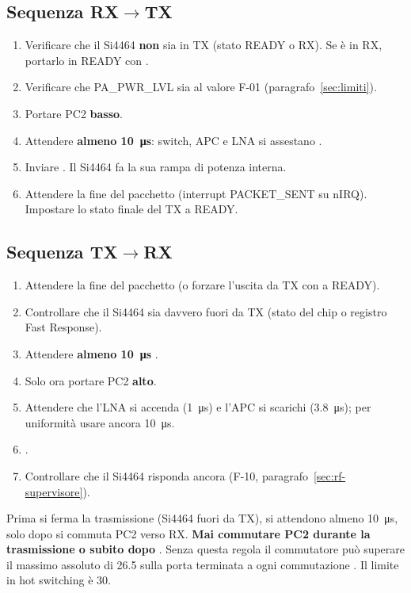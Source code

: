 \subsection{Sequenza RX\texorpdfstring{$\to$}{->}TX}
\begin{enumerate}
\item Verificare che il Si4464 \textbf{non} sia in TX (stato READY o RX). Se è in RX, portarlo in READY con .
\item Verificare che PA\_PWR\_LVL sia al valore F-01 (paragrafo~\ref{sec:limiti}).
\item Portare PC2 \textbf{basso}.
\item Attendere \textbf{almeno \SI{10}{\micro\second}}: switch, APC e LNA si assestano .
\item Inviare . Il Si4464 fa la sua rampa di potenza interna.
\item Attendere la fine del pacchetto (interrupt PACKET\_SENT su nIRQ). Impostare lo stato finale del TX a READY.
\end{enumerate}

\subsection{Sequenza TX\texorpdfstring{$\to$}{->}RX}
\begin{enumerate}
\item Attendere la fine del pacchetto (o forzare l'uscita da TX con  a READY).
\item Controllare che il Si4464 sia davvero fuori da TX (stato del chip o registro Fast Response).
\item Attendere \textbf{almeno \SI{10}{\micro\second}} .
\item Solo ora portare PC2 \textbf{alto}.
\item Attendere che l'LNA si accenda (\SI{1}{\micro\second}) e l'APC si scarichi (\SI{3.8}{\micro\second}); per uniformità usare ancora \SI{10}{\micro\second}.
\item {}.
\item Controllare che il Si4464 risponda ancora (F-10, paragrafo~\ref{sec:rf-supervisore}).
\end{enumerate}

\begin{attenzione}
Prima si ferma la trasmissione (Si4464 fuori da TX), si attendono almeno \SI{10}{\micro\second}, solo dopo si commuta PC2 verso RX. \textbf{Mai commutare PC2 durante la trasmissione o subito dopo} . Senza questa regola il commutatore può superare il massimo assoluto di \SI{26.5}{\dBm} sulla porta terminata a ogni commutazione . Il limite in hot switching è \SI{30}{\dBm}.
\end{attenzione}

